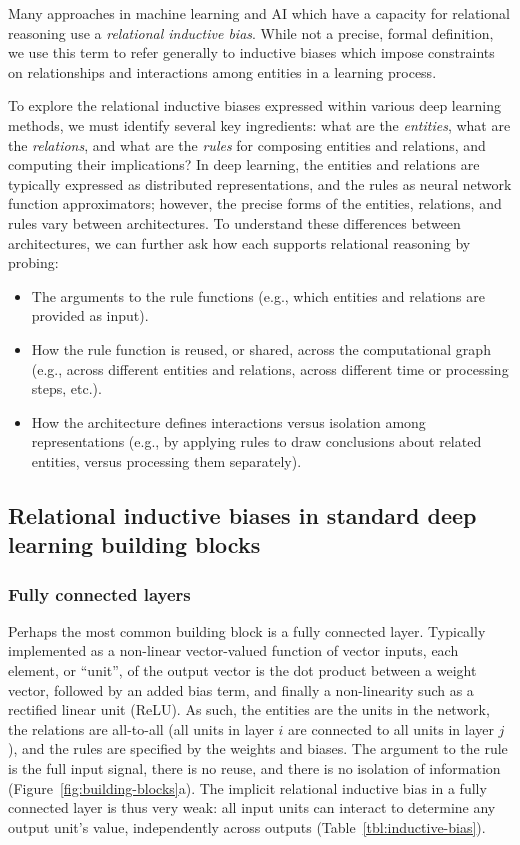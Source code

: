 \documentclass[10pt]{book}
\let\defaultmarginpar\marginpar
\renewcommand\marginpar[2][]{\defaultmarginpar{\itshape\color{gray}#2}}
\begin{document}
Many approaches in machine learning and AI which have a capacity for relational reasoning use a \emph{relational inductive bias}\marginpar{relational inductive bias}. While not a precise, formal definition, we use this term to refer generally to inductive biases  which impose constraints on relationships and interactions among entities in a learning process.

To explore the relational inductive biases expressed within various deep learning methods, we must identify several key ingredients: what are the \emph{entities}, what are the \emph{relations}, and what are the \emph{rules} for composing entities and relations, and computing their implications? In deep learning, the entities and relations are typically expressed as distributed representations, and the rules as neural network function approximators; however, the precise forms of the entities, relations, and rules vary between architectures. To understand these differences between architectures, we can further ask how each supports relational reasoning by probing:
\begin{itemize}
    \item The arguments to the rule functions (e.g., which entities and relations are provided as input).
    \item How the rule function is reused, or shared, across the computational graph (e.g., across different entities and relations, across different time or processing steps, etc.).
    \item How the architecture defines interactions versus isolation among representations (e.g., by applying rules to draw conclusions about related entities, versus processing them separately).
\end{itemize}

\subsection{Relational inductive biases in standard deep learning building blocks}

\subsubsection{Fully connected layers}

Perhaps the most common building block is a fully connected layer. Typically implemented as a non-linear vector-valued function of vector inputs, each element, or ``unit'', of the output vector is the dot product between a weight vector, followed by an added bias term, and finally a non-linearity such as a rectified linear unit (ReLU). As such, the entities are the units in the network, the relations are all-to-all (all units in layer $i$ are connected to all units in layer $j$), and the rules are specified by the weights and biases. The argument to the rule is the full input signal, there is no reuse, and there is no isolation of information (Figure~\ref{fig:building-blocks}a). The implicit relational inductive bias in a fully connected layer is thus very weak: all input units can interact to determine any output unit's value, independently across outputs (Table~\ref{tbl:inductive-bias}).
\end{document}
